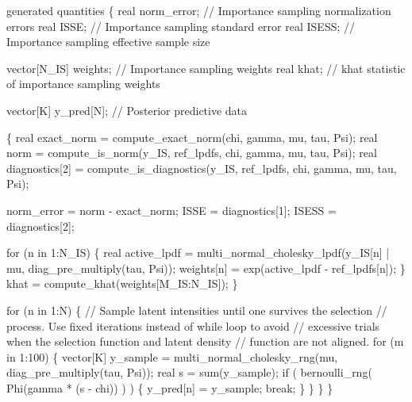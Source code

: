 \documentclass[
  letterpaper,
  DIV=11,
  numbers=noendperiod]{scrartcl}
\newenvironment{Shaded}{\begin{snugshade}}{\end{snugshade}}
\newcommand{\CommentTok}[1]{\textcolor[rgb]{0.37,0.37,0.37}{#1}}
\newcommand{\ControlFlowTok}[1]{\textcolor[rgb]{0.00,0.23,0.31}{#1}}
\newcommand{\DataTypeTok}[1]{\textcolor[rgb]{0.68,0.00,0.00}{#1}}
\newcommand{\DecValTok}[1]{\textcolor[rgb]{0.68,0.00,0.00}{#1}}
\newcommand{\KeywordTok}[1]{\textcolor[rgb]{0.00,0.23,0.31}{#1}}
\newcommand{\NormalTok}[1]{\textcolor[rgb]{0.00,0.23,0.31}{#1}}
\begin{document}
\begin{codelisting}
\begin{Shaded}
\begin{Highlighting}[]
\KeywordTok{generated quantities}\NormalTok{ \{}
  \DataTypeTok{real}\NormalTok{ norm\_error; }\CommentTok{// Importance sampling normalization errors}
  \DataTypeTok{real}\NormalTok{ ISSE;       }\CommentTok{// Importance sampling standard error}
  \DataTypeTok{real}\NormalTok{ ISESS;      }\CommentTok{// Importance sampling effective sample size}

  \DataTypeTok{vector}\NormalTok{[N\_IS] weights; }\CommentTok{// Importance sampling weights}
  \DataTypeTok{real}\NormalTok{ khat;            }\CommentTok{// khat statistic of importance sampling weights}

  \DataTypeTok{vector}\NormalTok{[K] y\_pred[N]; }\CommentTok{// Posterior predictive data}
  
\NormalTok{  \{}
    \DataTypeTok{real}\NormalTok{ exact\_norm = compute\_exact\_norm(chi, gamma, mu, tau, Psi);}
    \DataTypeTok{real}\NormalTok{ norm = compute\_is\_norm(y\_IS, ref\_lpdfs,}
\NormalTok{                                chi, gamma, mu, tau, Psi);}
    \DataTypeTok{real}\NormalTok{ diagnostics[}\DecValTok{2}\NormalTok{] = compute\_is\_diagnostics(y\_IS, ref\_lpdfs,}
\NormalTok{                                                 chi, gamma, mu, tau, Psi);}

\NormalTok{    norm\_error = norm {-} exact\_norm;}
\NormalTok{    ISSE = diagnostics[}\DecValTok{1}\NormalTok{];}
\NormalTok{    ISESS = diagnostics[}\DecValTok{2}\NormalTok{];}

    \ControlFlowTok{for}\NormalTok{ (n }\ControlFlowTok{in} \DecValTok{1}\NormalTok{:N\_IS) \{}
      \DataTypeTok{real}\NormalTok{ active\_lpdf =}
\NormalTok{        multi\_normal\_cholesky\_lpdf(y\_IS[n] | mu, diag\_pre\_multiply(tau, Psi));}
\NormalTok{      weights[n] = exp(active\_lpdf {-} ref\_lpdfs[n]);}
\NormalTok{    \}}
\NormalTok{    khat = compute\_khat(weights[M\_IS:N\_IS]);}
\NormalTok{  \}}

  \ControlFlowTok{for}\NormalTok{ (n }\ControlFlowTok{in} \DecValTok{1}\NormalTok{:N) \{}
    \CommentTok{// Sample latent intensities until one survives the selection}
    \CommentTok{// process.  Use fixed iterations instead of while loop to avoid }
    \CommentTok{// excessive trials when the selection function and latent density }
    \CommentTok{// function are not aligned.}
    \ControlFlowTok{for}\NormalTok{ (m }\ControlFlowTok{in} \DecValTok{1}\NormalTok{:}\DecValTok{100}\NormalTok{) \{}
      \DataTypeTok{vector}\NormalTok{[K] y\_sample}
\NormalTok{        = multi\_normal\_cholesky\_rng(mu, diag\_pre\_multiply(tau, Psi));}
      \DataTypeTok{real}\NormalTok{ s = sum(y\_sample);}
      \ControlFlowTok{if}\NormalTok{ ( bernoulli\_rng( Phi(gamma * (s {-} chi)) ) ) \{}
\NormalTok{        y\_pred[n] = y\_sample;}
        \ControlFlowTok{break}\NormalTok{;}
\NormalTok{      \}}
\NormalTok{    \}}
\NormalTok{  \}}
\NormalTok{\}}
\end{Highlighting}
\end{Shaded}

\end{codelisting}
\end{document}
